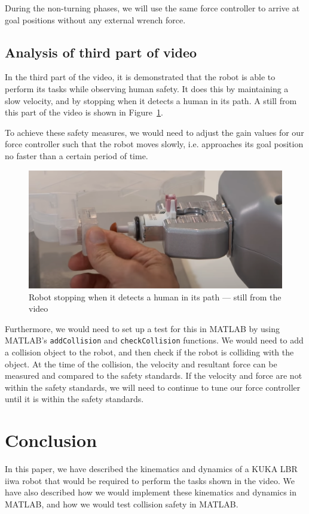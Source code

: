 \documentclass[conference]{IEEEtran}
\begin{document}
During the non-turning phases, we will use the same force controller to arrive at goal
positions without any external wrench force.

\subsection{Analysis of third part of video}
In the third part of the video, it is demonstrated that the robot is able to perform its tasks
while observing human safety. It does this by maintaining a slow velocity, and by stopping
when it detects a human in its path. A still from this part of the video is shown in Figure~\ref{kuka-human-safety}.

To achieve these safety measures, we would need to adjust the gain values for our force controller
such that the robot moves slowly, i.e. approaches its goal position no faster than a certain period
of time.

\begin{figure}[h!]
    \centering
    \includegraphics[scale=0.15]{kuka-human-safety.png}
    \caption{Robot stopping when it detects a human in its path --- still from the video}
    \label{kuka-human-safety}
\end{figure}
Furthermore, we would need to set up a test for this in MATLAB by using MATLAB's \texttt{addCollision} and
\texttt{checkCollision} functions. We would need to add a collision object to the robot, and then
check if the robot is colliding with the object. At the time of the collision, the velocity and resultant
force can be measured and compared to the safety standards. If the velocity and force are not within the
safety standards, we will need to continue to tune our force controller until it is within the safety standards.

\section{Conclusion}

In this paper, we have described the kinematics and dynamics of a KUKA LBR iiwa robot
that would be required to perform the tasks shown in the video. We have also described
how we would implement these kinematics and dynamics in MATLAB, and how we would test
collision safety in MATLAB.



\end{document}
